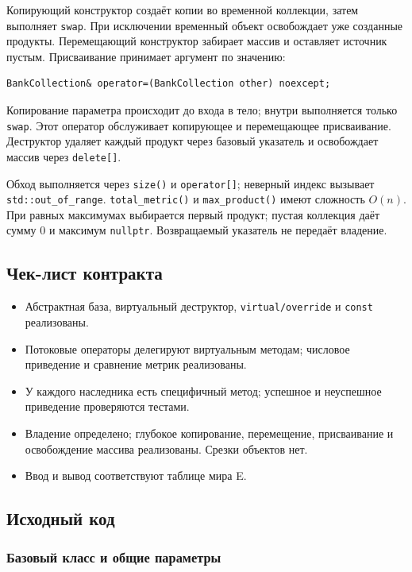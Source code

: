 Копирующий конструктор создаёт копии во временной коллекции, затем выполняет \texttt{swap}. При исключении временный объект освобождает уже созданные продукты. Перемещающий конструктор забирает массив и оставляет источник пустым. Присваивание принимает аргумент по значению:
\begin{lstlisting}[style=cppstyle]
BankCollection& operator=(BankCollection other) noexcept;
\end{lstlisting}
Копирование параметра происходит до входа в тело; внутри выполняется только \texttt{swap}. Этот оператор обслуживает копирующее и перемещающее присваивание. Деструктор удаляет каждый продукт через базовый указатель и освобождает массив через \texttt{delete[]}.

Обход выполняется через \texttt{size()} и \texttt{operator[]}; неверный индекс вызывает \texttt{std::out\_of\_range}. \texttt{total\_metric()} и \texttt{max\_product()} имеют сложность $O(n)$. При равных максимумах выбирается первый продукт; пустая коллекция даёт сумму 0 и максимум \texttt{nullptr}. Возвращаемый указатель не передаёт владение.

\subsection{Чек-лист контракта}
\begin{itemize}
\item Абстрактная база, виртуальный деструктор, \texttt{virtual/override} и \texttt{const} реализованы.
\item Потоковые операторы делегируют виртуальным методам; числовое приведение и сравнение метрик реализованы.
\item У каждого наследника есть специфичный метод; успешное и неуспешное приведение проверяются тестами.
\item Владение определено; глубокое копирование, перемещение, присваивание и освобождение массива реализованы. Срезки объектов нет.
\item Ввод и вывод соответствуют таблице мира E.
\end{itemize}

\subsection{Исходный код}
\subsubsection{Базовый класс и общие параметры}





